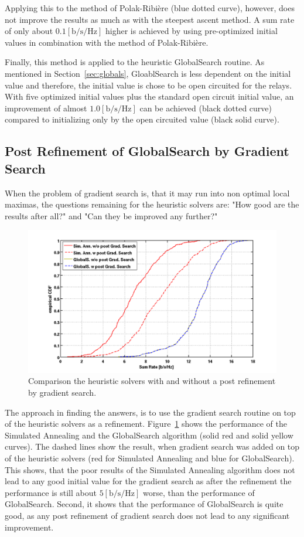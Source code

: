 Applying this to the method of Polak-Ribi\`{e}re (blue dotted curve), however, does not improve the results as much as with the steepest ascent method.
A sum rate of only about $0.1 \left[\text{b/s/Hz}\right]$ higher is achieved by using pre-optimized initial values in combination with the method of Polak-Ribi\`{e}re.

Finally, this method is applied to the heuristic GlobalSearch routine.
As mentioned in Section~\ref{sec:globals}, GloablSearch is less dependent on the initial value and therefore, the initial value is chose to be open circuited for the relays.
With five optimized initial values plus the standard open circuit initial value, an improvement of almost $1.0 \left[\text{b/s/Hz}\right]$ can be achieved (black dotted curve) compared to initializing only by the open circuited value (black solid curve).


\subsection{Post Refinement of GlobalSearch by Gradient Search}
\label{sec:postrefinement}
When the problem of gradient search is, that it may run into non optimal local maximas, the questions remaining for the heuristic solvers are: "How good are the results after all?" and "Can they be improved any further?"

\begin{figure}[h]
\centering
  \includegraphics[width=0.7\linewidth]{images/Postrefinementcomparison.png}
\caption{Comparison the heuristic solvers with and without a post refinement by gradient search.}
\label{fig:postrefinement}
\end{figure}

The approach in finding the answers, is to use the gradient search routine on top of the heuristic solvers as a refinement.
Figure~\ref{fig:postrefinement} shows the performance of the Simulated Annealing and the GlobalSearch algorithm (solid red and solid yellow curves).
The dashed lines show the result, when gradient search was added on top of the heuristic solvers (red for Simulated Annealing and blue for GlobalSearch).
This shows, that the poor results of the Simulated Annealing algorithm does not lead to any good initial value for the gradient search as after the refinement the performance is still about $5 \left[\text{b/s/Hz}\right]$ worse, than the performance of GlobalSearch.
Second, it shows that the performance of GlobalSearch is quite good, as any post refinement of gradient search does not lead to any significant improvement.


